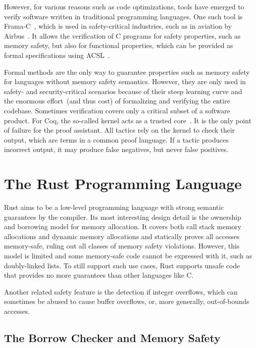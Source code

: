 However, for various reasons such as code optimizations, tools have emerged to verify software written in traditional programming languages. One such tool is Frama-C~\cite{frama-c}, which is used in safety-critical industries, such as in aviation by Airbus~\cite{cuoq:hal-02263407}. It allows the verification of \gls{C} programs for safety properties, such as memory safety, but also for functional properties, which can be provided as formal specifications using \gls{ACSL}~\cite{acsl}.

Formal methods are the only way to guarantee properties such as memory safety for languages without memory safety semantics. However, they are only used in safety- and security-critical scenarios because of their steep learning curve and the enormous effort~(and thus cost) of formalizing and verifying the entire codebase. Sometimes verification covers only a critical subset of a software product. For Coq, the so-called kernel acts as a trusted core~\cite{coq}. It is the only point of failure for the proof assistant. All tactics rely on the kernel to check their output, which are terms in a common proof language. If a tactic produces incorrect output, it may produce false negatives, but never false positives.

\section{The Rust Programming Language}

Rust aims to be a low-level programming language with strong semantic guarantees by the compiler. Its most interesting design detail is the ownership and borrowing model for memory allocation. It covers both call stack memory allocations and dynamic memory allocations and statically proves all accesses memory-safe, ruling out all classes of memory safety violations. However, this model is limited and some memory-safe code cannot be expressed with it, such as doubly-linked lists. To still support such use cases, Rust supports unsafe code that provides no more guarantees than other languages like C.

Another related safety feature is the detection if integer overflows, which can sometimes be abused to cause buffer overflows, or, more generally, out-of-bounds accesses.

\subsection{The Borrow Checker and Memory Safety}

